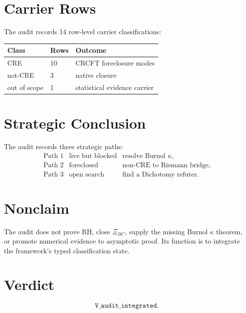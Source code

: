 \documentclass[11pt]{article}
\begin{document}
\section*{Carrier Rows}

The audit records 14 row-level carrier classifications:
\begin{center}
\begin{tabular}{lll}
\toprule
Class & Rows & Outcome\\
\midrule
CRE & 10 & CRCFT foreclosure modes\\
not-CRE & 3 & native closure\\
out of scope & 1 & statistical evidence carrier\\
\bottomrule
\end{tabular}
\end{center}

\section*{Strategic Conclusion}

The audit records three strategic paths:
\[
\begin{array}{lll}
\text{Path 1} & \text{live but blocked} & \text{resolve Burnol } \kappa,\\
\text{Path 2} & \text{foreclosed} & \text{non-CRE to Riemann bridge},\\
\text{Path 3} & \text{open search} & \text{find a Dichotomy refuter}.
\end{array}
\]

\section*{Nonclaim}

The audit does not prove RH, close \(\Xi_{BC}\), supply the missing Burnol
\(\kappa\) theorem, or promote numerical evidence to asymptotic proof.  Its
function is to integrate the framework's typed classification state.

\section*{Verdict}

\[
\boxed{\texttt{V\_audit\_integrated}.}
\]
\end{document}
